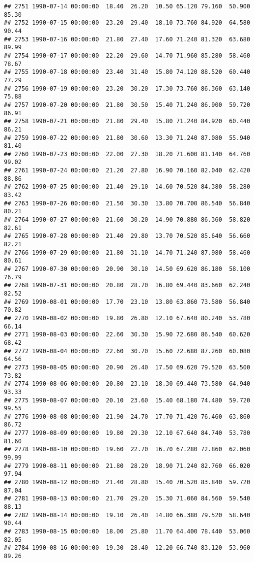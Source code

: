 \documentclass{article}\usepackage{graphicx, color}
\makeatletter
\newenvironment{kframe}{%
 \def\at@end@of@kframe{}%
 \ifinner\ifhmode%
  \def\at@end@of@kframe{\end{minipage}}%
  \begin{minipage}{\columnwidth}%
 \fi\fi%
 \def\FrameCommand##1{\hskip\@totalleftmargin \hskip-\fboxsep
 \colorbox{shadecolor}{##1}\hskip-\fboxsep
     \hskip-\linewidth \hskip-\@totalleftmargin \hskip\columnwidth}%
 \MakeFramed {\advance\hsize-\width
   \@totalleftmargin\z@ \linewidth\hsize
   \@setminipage}}%
 {\par\unskip\endMakeFramed%
 \at@end@of@kframe}
\newenvironment{knitrout}{}{} %
\makeatother
\begin{document}
\begin{knitrout}
\begin{kframe}
\begin{verbatim}
## 2751 1990-07-14 00:00:00  18.40  26.20  10.50 65.120 79.160  50.900  85.30
## 2752 1990-07-15 00:00:00  23.20  29.40  18.10 73.760 84.920  64.580  90.44
## 2753 1990-07-16 00:00:00  21.80  27.40  17.60 71.240 81.320  63.680  89.99
## 2754 1990-07-17 00:00:00  22.20  29.60  14.70 71.960 85.280  58.460  78.67
## 2755 1990-07-18 00:00:00  23.40  31.40  15.80 74.120 88.520  60.440  77.29
## 2756 1990-07-19 00:00:00  23.20  30.20  17.30 73.760 86.360  63.140  75.88
## 2757 1990-07-20 00:00:00  21.80  30.50  15.40 71.240 86.900  59.720  86.91
## 2758 1990-07-21 00:00:00  21.80  29.40  15.80 71.240 84.920  60.440  86.21
## 2759 1990-07-22 00:00:00  21.80  30.60  13.30 71.240 87.080  55.940  81.40
## 2760 1990-07-23 00:00:00  22.00  27.30  18.20 71.600 81.140  64.760  99.02
## 2761 1990-07-24 00:00:00  21.20  27.80  16.90 70.160 82.040  62.420  88.86
## 2762 1990-07-25 00:00:00  21.40  29.10  14.60 70.520 84.380  58.280  83.42
## 2763 1990-07-26 00:00:00  21.50  30.30  13.80 70.700 86.540  56.840  80.21
## 2764 1990-07-27 00:00:00  21.60  30.20  14.90 70.880 86.360  58.820  82.61
## 2765 1990-07-28 00:00:00  21.40  29.80  13.70 70.520 85.640  56.660  82.21
## 2766 1990-07-29 00:00:00  21.80  31.10  14.70 71.240 87.980  58.460  80.61
## 2767 1990-07-30 00:00:00  20.90  30.10  14.50 69.620 86.180  58.100  76.79
## 2768 1990-07-31 00:00:00  20.80  28.70  16.80 69.440 83.660  62.240  82.52
## 2769 1990-08-01 00:00:00  17.70  23.10  13.80 63.860 73.580  56.840  70.82
## 2770 1990-08-02 00:00:00  19.80  26.80  12.10 67.640 80.240  53.780  66.14
## 2771 1990-08-03 00:00:00  22.60  30.30  15.90 72.680 86.540  60.620  68.42
## 2772 1990-08-04 00:00:00  22.60  30.70  15.60 72.680 87.260  60.080  64.56
## 2773 1990-08-05 00:00:00  20.90  26.40  17.50 69.620 79.520  63.500  73.82
## 2774 1990-08-06 00:00:00  20.80  23.10  18.30 69.440 73.580  64.940  93.33
## 2775 1990-08-07 00:00:00  20.10  23.60  15.40 68.180 74.480  59.720  99.55
## 2776 1990-08-08 00:00:00  21.90  24.70  17.70 71.420 76.460  63.860  86.72
## 2777 1990-08-09 00:00:00  19.80  29.30  12.10 67.640 84.740  53.780  81.60
## 2778 1990-08-10 00:00:00  19.60  22.70  16.70 67.280 72.860  62.060  99.99
## 2779 1990-08-11 00:00:00  21.80  28.20  18.90 71.240 82.760  66.020  97.94
## 2780 1990-08-12 00:00:00  21.40  28.80  15.40 70.520 83.840  59.720  87.04
## 2781 1990-08-13 00:00:00  21.70  29.20  15.30 71.060 84.560  59.540  88.13
## 2782 1990-08-14 00:00:00  19.10  26.40  14.80 66.380 79.520  58.640  90.44
## 2783 1990-08-15 00:00:00  18.00  25.80  11.70 64.400 78.440  53.060  82.05
## 2784 1990-08-16 00:00:00  19.30  28.40  12.20 66.740 83.120  53.960  89.26

\end{verbatim}
\end{kframe}
\end{knitrout}
\end{document}
